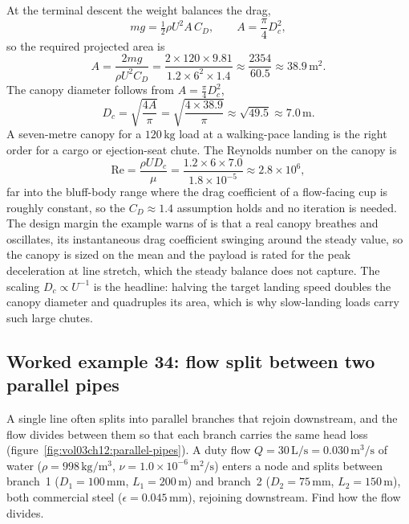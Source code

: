 At the terminal descent the weight balances the drag,
\[
m g = \tfrac12\rho U^2 A\,C_D, \qquad A = \frac{\pi}{4}D_c^2,
\]
so the required projected area is
\[
A = \frac{2 m g}{\rho U^2 C_D} = \frac{2\times120\times9.81}{1.2\times
6^2\times1.4} \approx \frac{2354}{60.5} \approx 38.9\,\si{\meter\squared}.
\]
The canopy diameter follows from $A = \tfrac{\pi}{4}D_c^2$,
\[
D_c = \sqrt{\frac{4 A}{\pi}} = \sqrt{\frac{4\times38.9}{\pi}} \approx
\sqrt{49.5} \approx 7.0\,\si{\meter}.
\]
A seven-metre canopy for a $120\,\si{\kilogram}$ load at a walking-pace
landing is the right order for a cargo or ejection-seat chute. The
Reynolds number on the canopy is
\[
\text{Re} = \frac{\rho U D_c}{\mu} = \frac{1.2\times6\times7.0}{1.8\times
10^{-5}} \approx 2.8\times10^{6},
\]
far into the bluff-body range where the drag coefficient of a
flow-facing cup is roughly constant, so the $C_D\approx1.4$ assumption
holds and no iteration is needed. The design margin the example warns of
is that a real canopy breathes and oscillates, its instantaneous drag
coefficient swinging around the steady value, so the canopy is sized on
the mean and the payload is rated for the peak deceleration at line
stretch, which the steady balance does not capture. The scaling $D_c
\propto U^{-1}$ is the headline: halving the target landing speed
doubles the canopy diameter and quadruples its area, which is why
slow-landing loads carry such large chutes.

\subsection*{Worked example 34: flow split between two parallel pipes}

A single line often splits into parallel branches that rejoin
downstream, and the flow divides between them so that each branch carries
the same head loss (figure~\ref{fig:vol03ch12:parallel-pipes}). A duty
flow $Q = 30\,\si{\liter\per\second} = 0.030\,\si{\meter\cubed\per
\second}$ of water ($\rho = 998\,\si{\kilogram\per\meter\cubed}$, $\nu =
1.0\times10^{-6}\,\si{\meter}^2/\si{\second}$) enters a node and splits
between branch~1 ($D_1 = 100\,\si{\milli\meter}$, $L_1 = 200\,\si{\meter}$)
and branch~2 ($D_2 = 75\,\si{\milli\meter}$, $L_2 = 150\,\si{\meter}$),
both commercial steel ($\epsilon = 0.045\,\si{\milli\meter}$), rejoining
downstream. Find how the flow divides.

